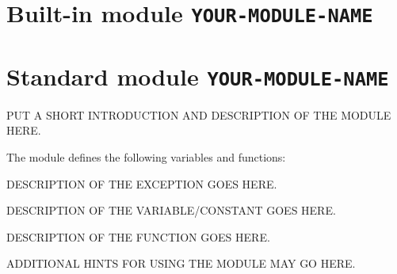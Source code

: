 
\section{Built-in module {\tt YOUR-MODULE-NAME}} %
\section{Standard module {\tt YOUR-MODULE-NAME}} %

PUT A SHORT INTRODUCTION AND DESCRIPTION OF THE MODULE HERE.

The module defines the following variables and functions:

\begin{description}

\renewcommand{\indexsubitem}{(in module YOUR-MODULE-NAME)}




DESCRIPTION OF THE EXCEPTION GOES HERE.


DESCRIPTION OF THE VARIABLE/CONSTANT GOES HERE.


DESCRIPTION OF THE FUNCTION GOES HERE.


\end{description}

ADDITIONAL HINTS FOR USING THE MODULE MAY GO HERE.
